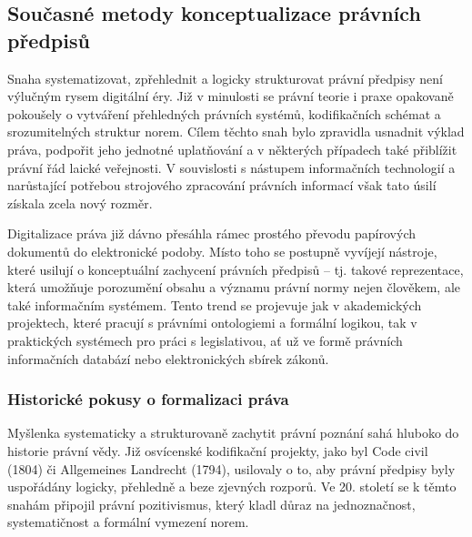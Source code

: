 
\subsection{Současné metody konceptualizace právních předpisů}
\label{sec:současné-metody-konceptualizace-právních-předpisů}
Snaha systematizovat, zpřehlednit a logicky strukturovat právní předpisy není výlučným rysem digitální éry. Již v minulosti se právní teorie i praxe opakovaně pokoušely o vytváření přehledných právních systémů, kodifikačních schémat a srozumitelných struktur norem. Cílem těchto snah bylo zpravidla usnadnit výklad práva, podpořit jeho jednotné uplatňování a v některých případech také přiblížit právní řád laické veřejnosti. V souvislosti s nástupem informačních technologií a narůstající potřebou strojového zpracování právních informací však tato úsilí získala zcela nový rozměr. \cite{Mcculloch2006}

Digitalizace práva již dávno přesáhla rámec prostého převodu papírových dokumentů do elektronické podoby. Místo toho se postupně vyvíjejí nástroje, které usilují o konceptuální zachycení právních předpisů – tj. takové reprezentace, která umožňuje porozumění obsahu a významu právní normy nejen člověkem, ale také informačním systémem. Tento trend se projevuje jak v akademických projektech, které pracují s právními ontologiemi a formální logikou, tak v praktických systémech pro práci s legislativou, ať už ve formě právních informačních databází nebo elektronických sbírek zákonů. \cite{Cotterrell2006}


\subsubsection{Historické pokusy o formalizaci práva}
Myšlenka systematicky a strukturovaně zachytit právní poznání sahá hluboko do historie právní vědy. Již osvícenské kodifikační projekty, jako byl Code civil (1804) \cite{FrenchCivilCode} či Allgemeines Landrecht (1794), usilovaly o to, aby právní předpisy byly uspořádány logicky, přehledně a beze zjevných rozporů. Ve 20. století se k těmto snahám připojil právní pozitivismus, který kladl důraz na jednoznačnost, systematičnost a formální vymezení norem. \cite{Mcculloch2006}

